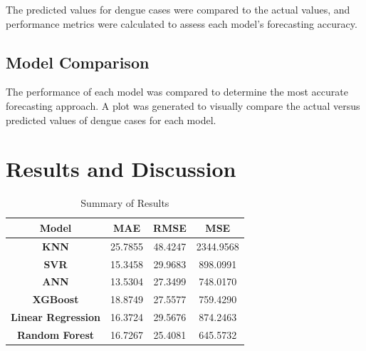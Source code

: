 \documentclass{article}
\begin{document}
The predicted values for dengue cases were compared to the actual values, and performance metrics were calculated to assess each model's forecasting accuracy.

\subsection{Model Comparison}
The performance of each model was compared to determine the most accurate forecasting approach. A plot was generated to visually compare the actual versus predicted values of dengue cases for each model.

\pagebreak
\section{Results and Discussion}
\begin{table}[h!]
\centering
\begin{tabular}{||c | c | c | c||} 
 \hline
 \textbf{Model} & \textbf{MAE} & \textbf{RMSE} & \textbf{MSE} \\ [1ex] 
 \hline
 \textbf{KNN} & 25.7855 & 48.4247 & 2344.9568 \\ 
 \hline
 \textbf{SVR} & 15.3458 & 29.9683 & 898.0991 \\
 \hline
 \textbf{ANN} & 13.5304 & 27.3499 & 748.0170 \\
 \hline
 \textbf{XGBoost} & 18.8749 & 27.5577 & 759.4290 \\
 \hline
 \textbf{Linear Regression} & 16.3724 & 29.5676 & 874.2463 \\ 
 \hline
 \textbf{Random Forest} & 16.7267 & 25.4081 & 645.5732 \\ [1ex] 
 \hline
\end{tabular}
\caption{Summary of Results}
\label{table:summary}
\end{table}
\end{document}
